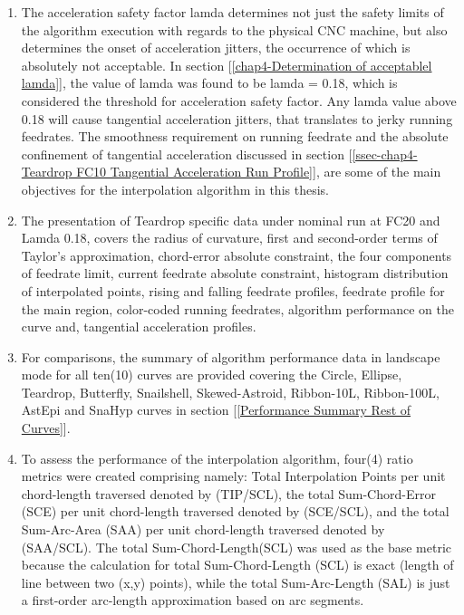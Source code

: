 \begin{enumerate}
\item The acceleration safety factor lamda determines not just the safety limits of the algorithm execution with regards to the physical CNC machine, but also determines the onset of acceleration jitters, the occurrence of which is absolutely not acceptable. In section [\ref{chap4-Determination of acceptablel lamda}], the value of lamda  was found to be lamda = 0.18, which is considered the threshold for acceleration safety factor. Any lamda value above 0.18 will cause tangential acceleration jitters, that translates to jerky running feedrates. The smoothness requirement on running feedrate and the absolute confinement of tangential acceleration discussed in section [\ref{ssec-chap4-Teardrop FC10 Tangential Acceleration Run Profile}], are some of the main objectives for the interpolation algorithm in this thesis.

\item The presentation of Teardrop specific data under nominal run at FC20 and Lamda 0.18, covers the radius of curvature, first and second-order terms of Taylor's approximation, chord-error absolute constraint, the four components of feedrate limit, current feedrate absolute constraint, histogram distribution of interpolated points, rising and falling feedrate profiles, feedrate profile for the main region, color-coded running feedrates, algorithm performance on the curve and, tangential acceleration profiles. 

\item For comparisons, the summary of algorithm performance data in landscape mode for all ten(10) curves are provided covering the Circle, Ellipse, Teardrop, Butterfly, Snailshell, Skewed-Astroid, Ribbon-10L, Ribbon-100L, AstEpi and SnaHyp curves in section [\ref{Performance Summary Rest of Curves}].

\item To assess the performance of the interpolation algorithm, four(4) ratio metrics were created comprising namely: Total Interpolation Points per unit chord-length traversed denoted by (TIP/SCL), the total Sum-Chord-Error (SCE) per unit chord-length traversed denoted by (SCE/SCL), and the total Sum-Arc-Area (SAA) per unit chord-length traversed denoted by (SAA/SCL). The total Sum-Chord-Length(SCL) was used as the base metric because the calculation for total Sum-Chord-Length (SCL) is exact (length of line between two (x,y) points), while the total Sum-Arc-Length (SAL) is just a first-order arc-length approximation based on arc segments.


\end{enumerate}
